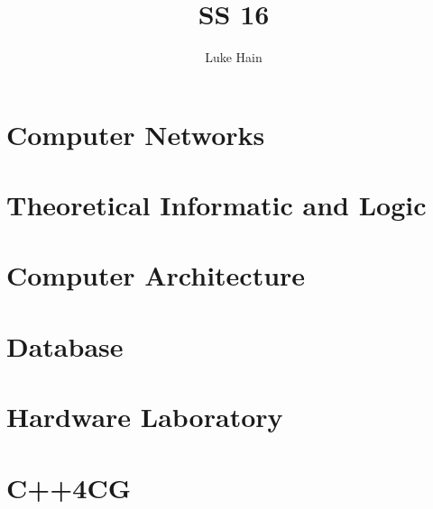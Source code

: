 \documentclass[a4paper, 12pt] {report} %
\author{Luke Hain}
\begin{document}
\title{SS 16}
\maketitle

\tableofcontents{}


\part{Computer Networks}



\part{Theoretical Informatic and Logic}



\part{Computer Architecture}



\part{Database}




\part{Hardware Laboratory}
%

\part{C++4CG}
%
\end{document}
